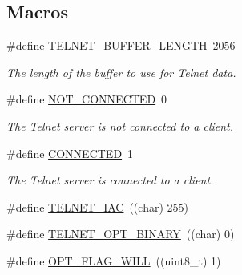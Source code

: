 \subsection*{Macros}
\begin{DoxyCompactItemize}
\item 
\hypertarget{group__telnet__server_gae9088b6c383afeff8d58098f141afbd3}{\#define \hyperlink{group__telnet__server_gae9088b6c383afeff8d58098f141afbd3}{T\-E\-L\-N\-E\-T\-\_\-\-B\-U\-F\-F\-E\-R\-\_\-\-L\-E\-N\-G\-T\-H}~2056}\label{group__telnet__server_gae9088b6c383afeff8d58098f141afbd3}

\begin{DoxyCompactList}\small\item\em The length of the buffer to use for Telnet data. \end{DoxyCompactList}\item 
\hypertarget{group__telnet__server_ga0e9795e3bb758850785e6ebc676ab01b}{\#define \hyperlink{group__telnet__server_ga0e9795e3bb758850785e6ebc676ab01b}{N\-O\-T\-\_\-\-C\-O\-N\-N\-E\-C\-T\-E\-D}~0}\label{group__telnet__server_ga0e9795e3bb758850785e6ebc676ab01b}

\begin{DoxyCompactList}\small\item\em The Telnet server is not connected to a client. \end{DoxyCompactList}\item 
\hypertarget{group__telnet__server_gaf6202935c026af12978d46a765dafb90}{\#define \hyperlink{group__telnet__server_gaf6202935c026af12978d46a765dafb90}{C\-O\-N\-N\-E\-C\-T\-E\-D}~1}\label{group__telnet__server_gaf6202935c026af12978d46a765dafb90}

\begin{DoxyCompactList}\small\item\em The Telnet server is connected to a client. \end{DoxyCompactList}\item 
\#define \hyperlink{group__telnet__server_ga8b600918f84783490fd791ce773175ab}{T\-E\-L\-N\-E\-T\-\_\-\-I\-A\-C}~((char) 255)
\item 
\#define \hyperlink{group__telnet__server_ga9b82c3af8c3a14bc1f758d79a00e9ee9}{T\-E\-L\-N\-E\-T\-\_\-\-O\-P\-T\-\_\-\-B\-I\-N\-A\-R\-Y}~((char) 0)
\item 
\hypertarget{group__telnet__server_ga87cde070c7f961821be5f38065c6a4a0}{\#define \hyperlink{group__telnet__server_ga87cde070c7f961821be5f38065c6a4a0}{O\-P\-T\-\_\-\-F\-L\-A\-G\-\_\-\-W\-I\-L\-L}~((uint8\-\_\-t) 1)}\label{group__telnet__server_ga87cde070c7f961821be5f38065c6a4a0}


\end{DoxyCompactItemize}
